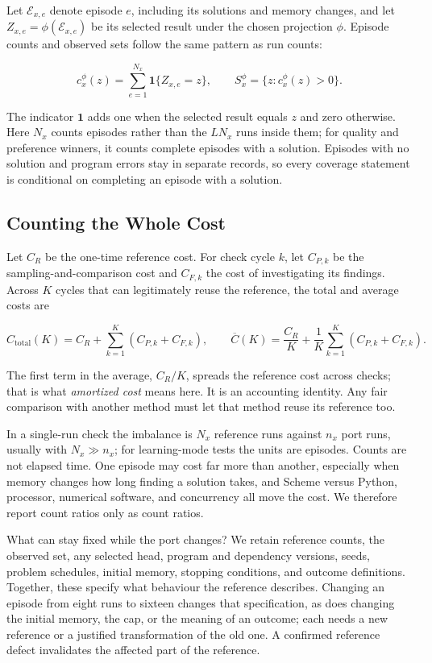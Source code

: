 \documentclass[10pt,letterpaper]{article}
\begin{document}
Let \(\mathcal E_{x,e}\) denote episode \(e\), including its solutions and memory changes,
and let \(Z_{x,e}=\phi(\mathcal E_{x,e})\) be its selected result under the chosen
projection \(\phi\). Episode counts and observed sets follow the same pattern as run
counts:

\[
c_x^\phi(z)=\sum_{e=1}^{N_x}\mathbf 1\{Z_{x,e}=z\},\qquad
S_x^\phi=\{z:c_x^\phi(z)>0\}.
\]

The indicator \(\mathbf 1\) adds one when the selected result equals \(z\) and zero
otherwise. Here \(N_x\) counts episodes rather than the \(L N_x\) runs inside them; for
quality and preference winners, it counts complete episodes with a solution. Episodes with
no solution and program errors stay in separate records, so every coverage statement is
conditional on completing an episode with a solution.

\subsection{Counting the Whole Cost}\label{sec:amortization}

Let \(C_R\) be the one-time reference cost. For check cycle \(k\), let \(C_{P,k}\) be the
sampling-and-comparison cost and \(C_{F,k}\) the cost of investigating its findings.
Across \(K\) cycles that can legitimately reuse the reference, the total and average costs
are

\[
C_{\mathrm{total}}(K)=C_R+\sum_{k=1}^{K}(C_{P,k}+C_{F,k}),\qquad
\overline C(K)=\frac{C_R}{K}+\frac{1}{K}\sum_{k=1}^{K}(C_{P,k}+C_{F,k}).
\]

The first term in the average, \(C_R/K\), spreads the reference cost across checks; that
is what \emph{amortized cost} means here. It is an accounting identity. Any fair
comparison with another method must let that method reuse its reference too.

In a single-run check the imbalance is \(N_x\) reference runs against \(n_x\) port runs,
usually with \(N_x\gg n_x\); for learning-mode tests the units are episodes. Counts are
not elapsed time. One episode may cost far more than another, especially when memory
changes how long finding a solution takes, and Scheme versus Python, processor, numerical
software, and concurrency all move the cost. We therefore report count ratios only as
count ratios.

What can stay fixed while the port changes? We retain reference counts, the observed set,
any selected head, program and dependency versions, seeds, problem schedules, initial
memory, stopping conditions, and outcome definitions. Together, these specify what
behaviour the reference describes. Changing an episode from eight runs to sixteen changes
that specification, as does changing the initial memory, the cap, or the meaning of an
outcome; each needs a new reference or a justified transformation of the old one. A
confirmed reference defect invalidates the affected part of the reference.
\end{document}
